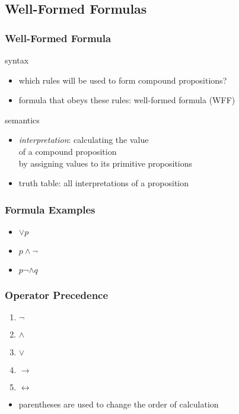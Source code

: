 \documentclass[dvipsnames]{beamer}
\begin{document}
\subsection{Well-Formed Formulas}

\begin{frame}
  \frametitle{Well-Formed Formula}

  \begin{block}{syntax}
    \begin{itemize}
      \item which rules will be used to form compound propositions?
      \item formula that obeys these rules: \alert{well-formed formula} (WFF)
    \end{itemize}
  \end{block}

  \pause
  \begin{block}{semantics}
    \begin{itemize}
      \item \emph{interpretation}: calculating the value\\
        of a compound proposition\\
        by assigning values to its primitive propositions
      \item truth table: all interpretations of a proposition
    \end{itemize}
  \end{block}
\end{frame}

\begin{frame}
  \frametitle{Formula Examples}

  \begin{example}
    \begin{itemize}
      \item $\vee p$
      \item $p \wedge \neg$
      \item $p \neg \wedge q$
    \end{itemize}
  \end{example}
\end{frame}

\begin{frame}
  \frametitle{Operator Precedence}

  \begin{enumerate}
    \item $\neg$
    \item $\wedge$
    \item $\vee$
    \item $\rightarrow$
    \item $\leftrightarrow$
  \end{enumerate}

  \begin{itemize}
    \item parentheses are used to change the order of calculation
  \end{itemize}
\end{frame}
\end{document}
